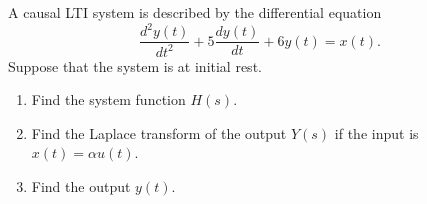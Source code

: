 \begin{frame}
    \begin{example}
        A causal LTI system is described by the differential equation
        \begin{equation*}
            \frac{d^2y(t)}{dt^2} + 5\frac{dy(t)}{dt} + 6y(t) = x(t).
        \end{equation*}
        Suppose that the system is at initial rest.
        \begin{enumerate}
            \item Find the system function $H(s)$.
            \item Find the Laplace transform of the output $Y(s)$ if the input is $x(t) = \alpha u(t)$.
            \item Find the output $y(t)$.
        \end{enumerate}
    \end{example}
\end{frame}

\begin{frame}
    \begin{center}
    \end{center}
\end{frame} 